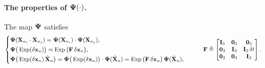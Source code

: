 \paragraph{The properties of $\vect{\Psi}(\cdot)$.} The map $\vect{\Psi}$ satisfies
\begin{align}
\begin{cases}
\vect{\Psi}(\vect{X}_{n_i}\cdot\vect{X}_{n_j}) = \vect{\Psi}(\vect{X}_{n_i})\cdot\vect{\Psi}(\vect{X}_{n_j}), \\[2pt]
\vect{\Psi}\big(\Exp(\delta\vect{x}_n)\big) \approx \Exp\big(\vect{F}\,\delta\vect{x}_n\big), \\[2pt]
\vect{\Psi}\big(\Exp(\delta\vect{x}_n)\,\hat{\vect{X}}_n\big) = \vect{\Psi}\big(\Exp(\delta\vect{x}_n)\big)\cdot\vect{\Psi}(\hat{\vect{X}}_n) = \Exp\big(\vect{F}\,\delta\vect{x}_n\big)\,\vect{\Psi}(\hat{\vect{X}}_n),
\end{cases}
\qquad
\vect{F} \triangleq
\begin{bmatrix}
\vect{I}_3 & \vect{0}_3 & \vect{0}_3 \\
\vect{0}_3 & \vect{I}_3 & \vect{I}_3\,\delta t \\
\vect{0}_3 & \vect{0}_3 & \vect{I}_3
\end{bmatrix}.
\end{align}

